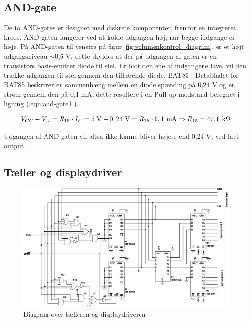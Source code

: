 \subsection*{AND-gate}
\label{volumenkontrol-design-and}

De to AND-gates er designet med diskrete komponenter, fremfor en integreret kreds. AND-gaten fungerer ved at holde udgangen høj, når begge indgange er høje. På AND-gaten til venstre på figur \ref{fig:volumenkontrol_diagram}, er et højt udgangsniveau $\sim$0,6 V, dette skyldes at der på udgangen af gaten er en transistors basis-emitter diode til stel. Er blot den ene af indgangene lave, vil den trække udgangen til stel gennem den tilhørende diode, BAT85 \cite{bat85-datablad}. Databladet for BAT85 beskriver en sammenhæng mellem en diode spænding på 0,24 V og en strøm gennem den på 0,1 mA, dette resultere i en Pull-up modstand beregnet i ligning (\ref{equ:and-gate1}).

\begin{equation}
\label{equ:and-gate1}
V_{CC} - V_D = R_{15} \cdot I_F = 5~\mathrm{V} - 0,24~\mathrm{V} = R_{15} \cdot 0,1~\mathrm{mA} \Rightarrow R_{15} = 47,6~\mathrm{k}\ohm
\end{equation}

Udgangen af AND-gaten vil altså ikke kunne bliver højere end 0,24 V, ved lavt output.

\clearpage
\subsection*{Tæller og displaydriver}
\label{volumenkontrol-design-taeller}

\begin{figure}[h]
\centering
\includegraphics[width=\textwidth]{teknisk/volumenkontrol/taeller.png}
\caption{Diagram over tælleren og displaydriveren}
\label{fig:taeller}
\end{figure}

